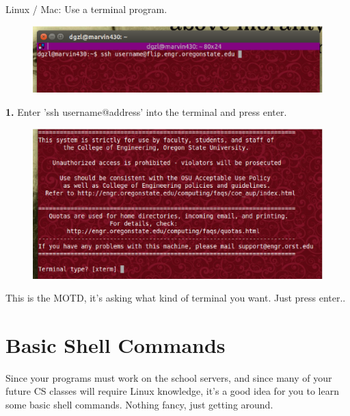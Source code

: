 \documentclass[letterpaper,10pt,titlepage,fleqn]{article}
\begin{document}
Linux / Mac: Use a terminal program.

\begin{figure}[ht!]
  \includegraphics[scale=0.5]{images/ssh_terminal.eps}
\end{figure}    

\textbf{1.} Enter 'ssh username@address' into the terminal and press enter.


\begin{figure}[ht!]
  \includegraphics[scale=0.5]{images/ssh_terminal2.eps}
\end{figure}    

This is the MOTD, it's asking what kind of terminal you want. Just press enter..

\newpage
\newpage

\section{Basic Shell Commands}

Since your programs must work on the school servers, and since many of your future
CS classes will require Linux knowledge, it's a good idea for you to learn some
basic shell commands. Nothing fancy, just getting around.
\end{document}
